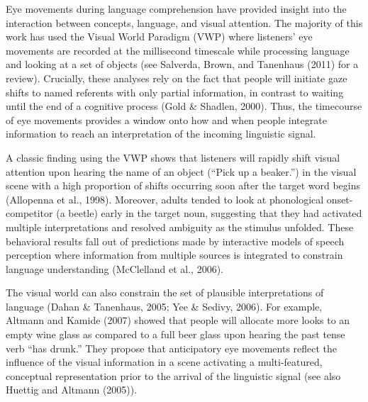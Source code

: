 \documentclass[english,floatsintext,man]{apa6}
\begin{document}
Eye movements during language comprehension have provided insight into
the interaction between concepts, language, and visual attention. The
majority of this work has used the Visual World Paradigm (VWP) where
listeners' eye movements are recorded at the millisecond timescale while
processing language and looking at a set of objects (see Salverda,
Brown, and Tanenhaus (2011) for a review). Crucially, these analyses
rely on the fact that people will initiate gaze shifts to named
referents with only partial information, in contrast to waiting until
the end of a cognitive process (Gold \& Shadlen, 2000). Thus, the
timecourse of eye movements provides a window onto how and when people
integrate information to reach an interpretation of the incoming
linguistic signal.

A classic finding using the VWP shows that listeners will rapidly shift
visual attention upon hearing the name of an object (\enquote{Pick up a
beaker.}) in the visual scene with a high proportion of shifts occurring
soon after the target word begins (Allopenna et al., 1998). Moreover,
adults tended to look at phonological onset-competitor (a beetle) early
in the target noun, suggesting that they had activated multiple
interpretations and resolved ambiguity as the stimulus unfolded. These
behavioral results fall out of predictions made by interactive models of
speech perception where information from multiple sources is integrated
to constrain language understanding (McClelland et al., 2006).

The visual world can also constrain the set of plausible interpretations
of language (Dahan \& Tanenhaus, 2005; Yee \& Sedivy, 2006). For
example, Altmann and Kamide (2007) showed that people will allocate more
looks to an empty wine glass as compared to a full beer glass upon
hearing the past tense verb \enquote{has drunk.} They propose that
anticipatory eye movements reflect the influence of the visual
information in a scene activating a multi-featured, conceptual
representation prior to the arrival of the linguistic signal (see also
Huettig and Altmann (2005)).
\end{document}
